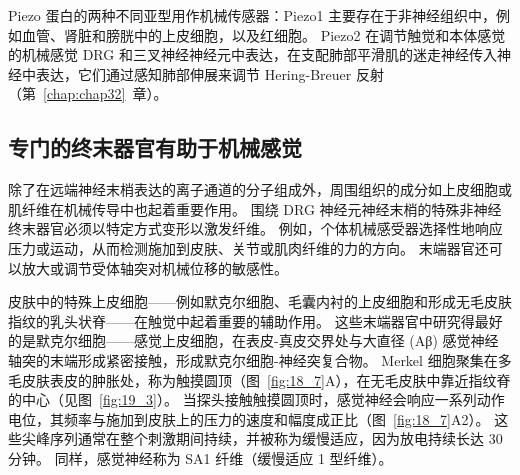 Piezo 蛋白的两种不同亚型用作机械传感器：Piezo1 主要存在于非神经组织中，例如血管、肾脏和膀胱中的上皮细胞，以及红细胞。
Piezo2 在调节触觉和本体感觉的机械感觉 DRG 和三叉神经神经元中表达，在支配肺部平滑肌的迷走神经传入神经中表达，它们通过感知肺部伸展来调节 Hering-Breuer 反射（第~\ref{chap:chap32}~章）。



\subsection{专门的终末器官有助于机械感觉}

除了在远端神经末梢表达的离子通道的分子组成外，周围组织的成分如上皮细胞或肌纤维在机械传导中也起着重要作用。
围绕 DRG 神经元神经末梢的特殊非神经终末器官必须以特定方式变形以激发纤维。
例如，个体机械感受器选择性地响应压力或运动，从而检测施加到皮肤、关节或肌肉纤维的力的方向。
末端器官还可以放大或调节受体轴突对机械位移的敏感性。


皮肤中的特殊上皮细胞——例如默克尔细胞、毛囊内衬的上皮细胞和形成无毛皮肤指纹的乳头状脊——在触觉中起着重要的辅助作用。
这些末端器官中研究得最好的是默克尔细胞——感觉上皮细胞，在表皮-真皮交界处与大直径 (Aβ) 感觉神经轴突的末端形成紧密接触，形成默克尔细胞-神经突复合物。
Merkel 细胞聚集在多毛皮肤表皮的肿胀处，称为触摸圆顶（图~\ref{fig:18_7}A），在无毛皮肤中靠近指纹脊的中心（见图~\ref{fig:19_3}）。
当探头接触触摸圆顶时，感觉神经会响应一系列动作电位，其频率与施加到皮肤上的压力的速度和幅度成正比（图~\ref{fig:18_7}A2）。
这些尖峰序列通常在整个刺激期间持续，并被称为缓慢适应，因为放电持续长达 30 分钟。
同样，感觉神经称为 SA1 纤维（缓慢适应 1 型纤维）。


